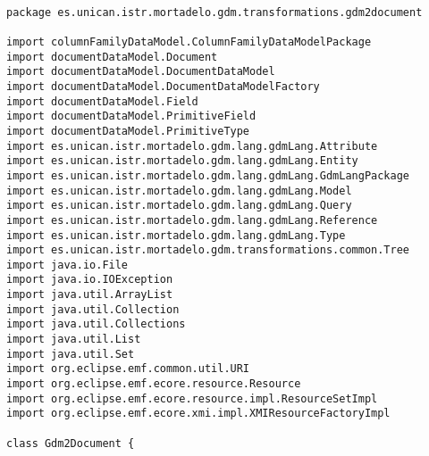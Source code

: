 \begin{code}
    \label{code:mortadelo-gdm-m2m}
    \begin{verbatim}

package es.unican.istr.mortadelo.gdm.transformations.gdm2document

import columnFamilyDataModel.ColumnFamilyDataModelPackage
import documentDataModel.Document
import documentDataModel.DocumentDataModel
import documentDataModel.DocumentDataModelFactory
import documentDataModel.Field
import documentDataModel.PrimitiveField
import documentDataModel.PrimitiveType
import es.unican.istr.mortadelo.gdm.lang.gdmLang.Attribute
import es.unican.istr.mortadelo.gdm.lang.gdmLang.Entity
import es.unican.istr.mortadelo.gdm.lang.gdmLang.GdmLangPackage
import es.unican.istr.mortadelo.gdm.lang.gdmLang.Model
import es.unican.istr.mortadelo.gdm.lang.gdmLang.Query
import es.unican.istr.mortadelo.gdm.lang.gdmLang.Reference
import es.unican.istr.mortadelo.gdm.lang.gdmLang.Type
import es.unican.istr.mortadelo.gdm.transformations.common.Tree
import java.io.File
import java.io.IOException
import java.util.ArrayList
import java.util.Collection
import java.util.Collections
import java.util.List
import java.util.Set
import org.eclipse.emf.common.util.URI
import org.eclipse.emf.ecore.resource.Resource
import org.eclipse.emf.ecore.resource.impl.ResourceSetImpl
import org.eclipse.emf.ecore.xmi.impl.XMIResourceFactoryImpl

class Gdm2Document {


\end{verbatim}
\end{code}
